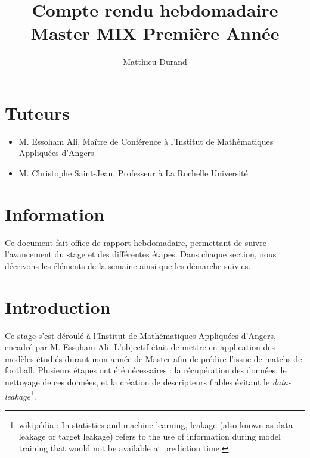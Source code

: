 \documentclass[11pt, a4paper]{report}
\title{Compte rendu hebdomadaire \\ Master MIX Première Année}
\author{Matthieu Durand}
\date{}
\begin{document}
\maketitle
\tableofcontents
\newpage

\section*{Tuteurs}
\begin{itemize}
    \item M. Essoham Ali, Maître de Conférence à l'Institut de Mathématiques Appliquées d'Angers
    \item M. Christophe Saint-Jean, Professeur à La Rochelle Université
\end{itemize}

\section{Information}
Ce document fait office de rapport hebdomadaire, permettant de suivre l'avancement du stage 
et des différentes étapes. 
Dans chaque section, nous décrivons les éléments de la semaine ainsi que les démarche 
suivies. 

\section*{Introduction}
Ce stage s'est déroulé à l'Institut de Mathématiques Appliquées d'Angers, 
encadré par M. Essoham Ali. L'objectif était de mettre en application des modèles 
étudiés durant mon année de Master afin de prédire l'issue de matchs de football. 
Plusieurs étapes ont été nécessaires : la récupération des données, le nettoyage 
de ces données, et la création de descripteurs fiables évitant le 
\textit{data-leakage}\footnote{wikipédia : In statistics and machine 
learning, leakage (also known as data leakage or target leakage) refers to the use of 
information during model training that would not be available at prediction time.}.









% 

% 
\end{document}
